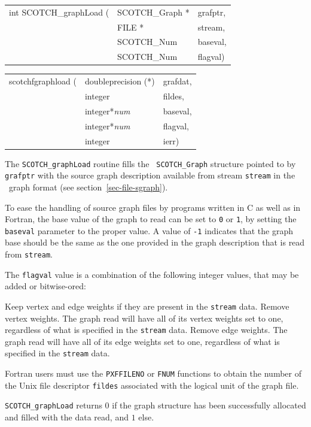 \begin{itemize}
\progsyn

{\tt\begin{tabular}{l@{}ll}
int SCOTCH\_graphLoad ( & SCOTCH\_Graph * & grafptr, \\
                        & FILE *          & stream,  \\
                        & SCOTCH\_Num     & baseval, \\
                        & SCOTCH\_Num     & flagval)
\end{tabular}}

{\tt\begin{tabular}{l@{}ll}
scotchfgraphload ( & doubleprecision (*) & grafdat, \\
                   & integer             & fildes,  \\
                   & integer*{\it num}   & baseval, \\
                   & integer*{\it num}   & flagval, \\
                   & integer             & ierr)
\end{tabular}}

\progdes

The {\tt SCOTCH\_graphLoad} routine fills the {\tt
SCOTCH\_\lbt Graph} structure pointed to by {\tt grafptr} with the
source graph description available from stream {\tt stream} in the
\scotch\ graph format (see section~\ref{sec-file-sgraph}).

To ease the handling of source graph files by programs written in C as
well as in Fortran, the base value of the graph to read can be set
to {\tt 0} or {\tt 1}, by setting the {\tt baseval} parameter to the
proper value. A value of {\tt -1} indicates that the graph base should
be the same as the one provided in the graph description that is read
from {\tt stream}.

The {\tt flagval} value is a combination of the following integer values,
that may be added or bitwise-ored:
\begin{itemize}
\iteme[{\tt 0}]
Keep vertex and edge weights if they are present in the {\tt stream} data.
\iteme[{\tt 1}]
Remove vertex weights. The graph read will have all of its vertex weights
set to one, regardless of what is specified in the {\tt stream} data.
\iteme[{\tt 2}]
Remove edge weights. The graph read will have all of its edge weights
set to one, regardless of what is specified in the {\tt stream} data.
\end{itemize}

Fortran users must use the {\tt PXFFILENO} or {\tt FNUM} functions to
obtain the number of the Unix file descriptor {\tt fildes} associated
with the logical unit of the graph file.

\progret

{\tt SCOTCH\_graphLoad} returns $0$ if the graph structure has been
successfully allocated and filled with the data read, and $1$ else.
\end{itemize}

